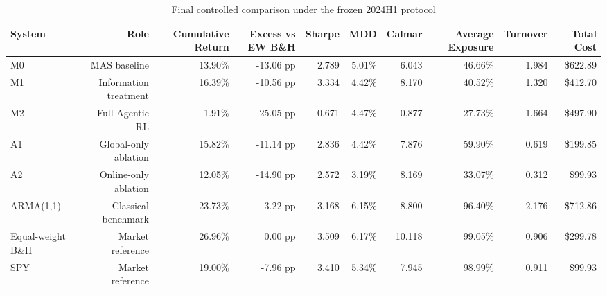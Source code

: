 \begin{table}[htbp]
\centering
\small
\caption{Final controlled comparison under the frozen 2024H1 protocol}
\label{tab:thesis-main-results}
\begin{tabular}{lrrrrrrrrr}
\toprule
System & Role & Cumulative Return & Excess vs EW B\&H & Sharpe & MDD & Calmar & Average Exposure & Turnover & Total Cost \\
\midrule
M0 & MAS baseline & 13.90\% & -13.06 pp & 2.789 & 5.01\% & 6.043 & 46.66\% & 1.984 & \$622.89 \\
M1 & Information treatment & 16.39\% & -10.56 pp & 3.334 & 4.42\% & 8.170 & 40.52\% & 1.320 & \$412.70 \\
M2 & Full Agentic RL & 1.91\% & -25.05 pp & 0.671 & 4.47\% & 0.877 & 27.73\% & 1.664 & \$497.90 \\
A1 & Global-only ablation & 15.82\% & -11.14 pp & 2.836 & 4.42\% & 7.876 & 59.90\% & 0.619 & \$199.85 \\
A2 & Online-only ablation & 12.05\% & -14.90 pp & 2.572 & 3.19\% & 8.169 & 33.07\% & 0.312 & \$99.93 \\
ARMA(1,1) & Classical benchmark & 23.73\% & -3.22 pp & 3.168 & 6.15\% & 8.800 & 96.40\% & 2.176 & \$712.86 \\
Equal-weight B\&H & Market reference & 26.96\% & 0.00 pp & 3.509 & 6.17\% & 10.118 & 99.05\% & 0.906 & \$299.78 \\
SPY & Market reference & 19.00\% & -7.96 pp & 3.410 & 5.34\% & 7.945 & 98.99\% & 0.911 & \$99.93 \\
\bottomrule
\end{tabular}
\end{table}
